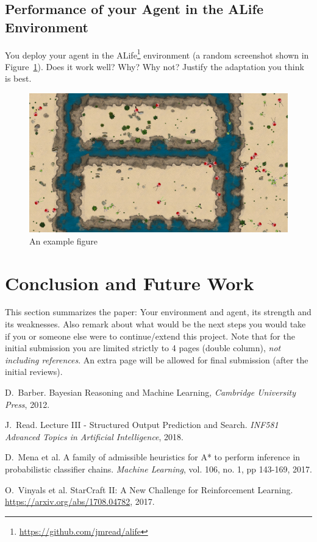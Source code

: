 \documentclass[journal, a4paper]{IEEEtran}
\theoremstyle{plain}
\theoremstyle{definition}
\begin{document}
\subsection{Performance of your Agent in the ALife Environment}

You deploy your agent in the ALife\footnote{\url{https://github.com/jmread/alife}} environment (a random screenshot shown in Figure~\ref{a_figure}). Does it work well? Why? Why not? Justify the adaptation you think is best.

\begin{figure}[h]
	\centering
	\includegraphics[width=0.8\columnwidth]{alife.png}
	\caption{\label{a_figure}An example figure}
\end{figure}


\section{Conclusion and Future Work}
	This section summarizes the paper: Your environment and agent, its strength and its weaknesses. Also remark about what would be the next steps you would take if you or someone else were to continue/extend this project. 
	Note that for the initial submission you are limited strictly to 4 pages (double column), \emph{not including references}. An extra page will be allowed for final submission (after the initial reviews). 

\begin{thebibliography}{4}

	D.~Barber. Bayesian Reasoning and Machine Learning,
	{\em Cambridge University Press}, 2012.

		J.~Read. Lecture III - Structured Output Prediction and Search. \textit{INF581 Advanced Topics in Artificial Intelligence}, 2018.

	D.~Mena et al. A family of admissible heuristics for A* to perform inference in probabilistic classifier chains.
	{\em Machine Learning}, vol. 106, no. 1, pp 143-169, 2017.

	O.~Vinyals et al. StarCraft {II:} {A} New Challenge for Reinforcement Learning.
	\url{https://arxiv.org/abs/1708.04782}, 2017. 

\end{thebibliography}

\end{document}

